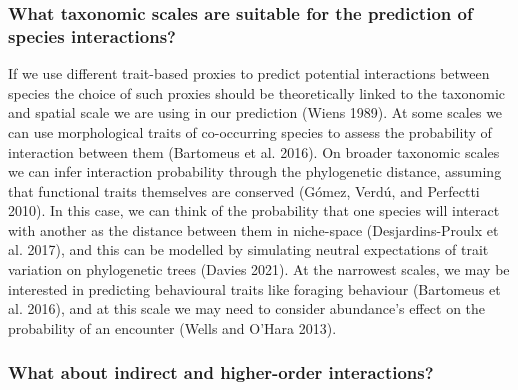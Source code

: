 \documentclass[10pt,oneside]{article}
\begin{document}
\hypertarget{what-taxonomic-scales-are-suitable-for-the-prediction-of-species-interactions}{%
\subsubsection{What taxonomic scales are suitable for the prediction of
species
interactions?}\label{what-taxonomic-scales-are-suitable-for-the-prediction-of-species-interactions}}

If we use different trait-based proxies to predict potential
interactions between species the choice of such proxies should be
theoretically linked to the taxonomic and spatial scale we are using in
our prediction (Wiens 1989). At some scales we can use morphological
traits of co-occurring species to assess the probability of interaction
between them (Bartomeus et al. 2016). On broader taxonomic scales we can
infer interaction probability through the phylogenetic distance,
assuming that functional traits themselves are conserved (Gómez, Verdú,
and Perfectti 2010). In this case, we can think of the probability that
one species will interact with another as the distance between them in
niche-space (Desjardins-Proulx et al. 2017), and this can be modelled by
simulating neutral expectations of trait variation on phylogenetic trees
(Davies 2021). At the narrowest scales, we may be interested in
predicting behavioural traits like foraging behaviour (Bartomeus et al.
2016), and at this scale we may need to consider abundance's effect on
the probability of an encounter (Wells and O'Hara 2013).

\hypertarget{what-about-indirect-and-higher-order-interactions}{%
\subsubsection{What about indirect and higher-order
interactions?}\label{what-about-indirect-and-higher-order-interactions}}
\end{document}
